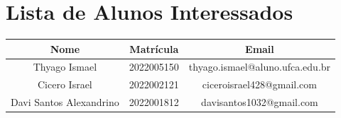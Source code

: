 \documentclass[12pt]{article}
\begin{document}


\section{Lista de Alunos Interessados}
\begin{table}[H]
    \centering
    \begin{tabular}{|c|c|c|}
        \hline
        Nome & Matrícula & Email\\ \hline
        Thyago Ismael & 2022005150 & thyago.ismael@aluno.ufca.edu.br\\
        Cicero Israel & 2022002121 & ciceroisrael428@gmail.com \\
        Davi Santos Alexandrino & 2022001812 & davisantos1032@gmail.com \\
        \hline
    \end{tabular}
    \label{tab:lista-interessados}
\end{table}


\vspace{24pt}


\end{document}
